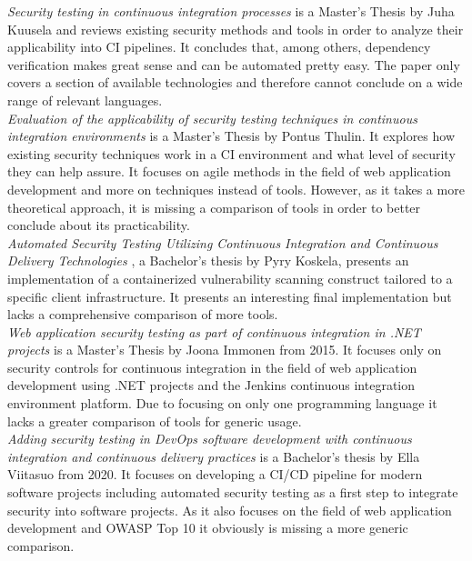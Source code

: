 \documentclass[conference]{IEEEtran}
\begin{document}
\noindent
\textit{Security testing in continuous integration processes} \cite{relatedpaper1} is a Master’s Thesis by Juha Kuusela and reviews existing security methods and tools in order to analyze their applicability into CI pipelines. It concludes that, among others, dependency verification makes great sense and can be automated pretty easy. The paper only covers a section of available technologies and therefore cannot conclude on a wide range of relevant languages.\\
 
\noindent
\textit{Evaluation of the applicability of security testing techniques in continuous integration environments} \cite{relatedpaper2} is a Master’s Thesis by Pontus Thulin. It explores how existing security techniques work in a CI environment and what level of security they can help assure. It focuses on agile methods in the field of web application development and more on techniques instead of tools. However, as it takes a more theoretical approach, it is missing a comparison of tools in order to better conclude about its practicability. \\

\noindent
\textit{Automated Security Testing Utilizing Continuous Integration and Continuous Delivery Technologies} \cite{relatedpaper3}, a Bachelor’s thesis by Pyry Koskela, presents an implementation of a containerized vulnerability scanning construct tailored to a specific client infrastructure. It presents an interesting final implementation but lacks a comprehensive comparison of more tools. \\

\noindent
\textit{Web application security testing as part of continuous integration in .NET projects} \cite{relatedpaper4} is a Master’s Thesis by Joona Immonen from 2015. It focuses only on security controls for continuous integration in the field of web application development using .NET projects and the Jenkins continuous integration environment platform. Due to focusing on only one programming language it lacks a greater comparison of tools for generic usage. \\

\noindent
\textit{Adding security testing in DevOps software development with continuous integration and continuous delivery practices} \cite{relatedpaper5} is a Bachelor’s thesis by Ella Viitasuo from 2020. It focuses on developing a CI/CD pipeline for modern software projects including automated security testing as a first step to integrate security into software projects. As it also focuses on the field of web application development and OWASP Top 10 it obviously is missing a more generic comparison. \\
\end{document}
